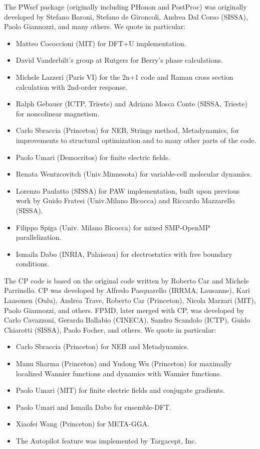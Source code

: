 \documentclass[12pt,a4paper]{article}
\begin{document}
The PWscf package (originally including PHonon and PostProc)
was originally developed by Stefano Baroni, Stefano
de Gironcoli, Andrea Dal Corso (SISSA), Paolo Giannozzi, and many others.
We quote in particular:
\begin{itemize}
  \item Matteo Cococcioni (MIT) for DFT+U implementation.
  \item David Vanderbilt's group at Rutgers for Berry's phase calculations.
  \item Michele Lazzeri (Paris VI) for the 2n+1 code and Raman cross section
 calculation with 2nd-order response.
  \item Ralph Gebauer (ICTP, Trieste) and Adriano Mosca Conte (SISSA, Trieste) 
for noncolinear magnetism.
  \item Carlo Sbraccia (Princeton) for NEB, Strings method, Metadynamics, for 
improvements to structural optimization and to many other parts of the code.
  \item Paolo Umari (Democritos) for finite electric fields.
  \item Renata Wentzcovitch (Univ.Minnesota) for variable-cell molecular 
dynamics.
  \item Lorenzo Paulatto (SISSA) for PAW implementation, built upon previous 
work by Guido Fratesi (Univ.Milano Bicocca) and Riccardo Mazzarello (SISSA).
\item Filippo Spiga (Univ. Milano Bicocca) for mixed SMP-OpenMP
 parallelization.
 \item Ismaila Dabo (INRIA, Palaiseau) for electrostatics with
 free boundary conditions.
\end{itemize}

The CP code is based on the original code written by Roberto Car and
Michele Parrinello. CP was developed by Alfredo Pasquarello (IRRMA, Lausanne),
Kari Laasonen (Oulu), Andrea Trave, Roberto Car (Princeton), 
Nicola Marzari (MIT), Paolo Giannozzi, and others.
FPMD, later merged with CP, was developed by Carlo Cavazzoni, 
Gerardo Ballabio (CINECA), Sandro Scandolo (ICTP), 
Guido Chiarotti (SISSA), Paolo Focher, and others.
We quote in particular:
\begin{itemize}
  \item Carlo Sbraccia (Princeton) for NEB and Metadynamics.
  \item Manu Sharma (Princeton) and Yudong Wu (Princeton) for maximally 
localized Wannier functions and dynamics with Wannier functions.
  \item Paolo Umari (MIT) for finite electric fields and conjugate gradients.
  \item Paolo Umari and Ismaila Dabo for ensemble-DFT.
  \item Xiaofei Wang (Princeton) for META-GGA.
  \item The Autopilot feature was implemented by Targacept, Inc.
\end{itemize}
\end{document}
